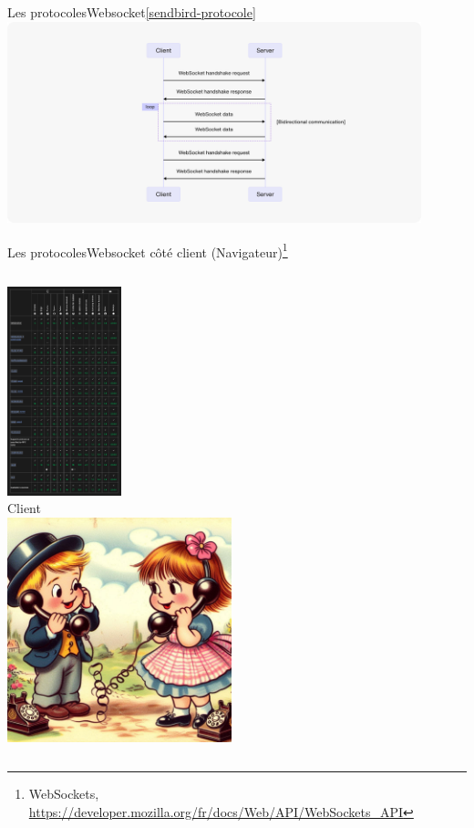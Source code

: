 \documentclass{beamer}
\begin{document}
    \begin{frame}{Les protocoles}{Websocket\cref{sendbird-protocole}}
        \centering
        \includegraphics[width=12cm]{image/tutorial-websocket-protocol-chart}
    \end{frame}

    \begin{frame}{Les protocoles}{Websocket côté client (Navigateur)\footnote{\label{mozilla-websocket}WebSockets, \url{https://developer.mozilla.org/fr/docs/Web/API/WebSockets_API}}}
        \begin{columns}
            \centering
            \includegraphics[width=3.3cm]{image/client-support} \\ Client \\
            \centering
            \includegraphics[width=6.5cm]{image/kids-on-the-phone}
        \end{columns}
    \end{frame}
\end{document}
